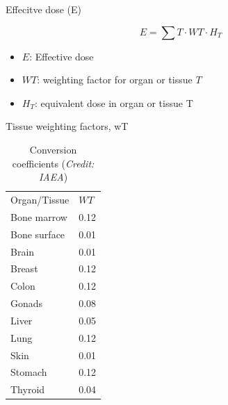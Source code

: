 \begin{frame}{Effecitve dose (E)}



\[E=\displaystyle\sum T\cdot WT\cdot H_T\]

\begin{itemize}
\item $E$: Effective dose
\item $WT$: weighting factor for organ or tissue $T$
\item $H_T$: equivalent dose in organ or tissue T
\end{itemize}


\end{frame}

\begin{frame}{Tissue weighting factors, wT}

\begin{table}[H]
\caption*{Conversion coefficients (\emph{Credit: IAEA})}
\begin{center}
  \begin{tabular}{ll}
  \toprule
  Organ/Tissue & $WT$  \\ \otoprule
Bone marrow & 0.12 \\ 
Bone surface & 0.01 \\
Brain & 0.01 \\
Breast & 0.12 \\
Colon & 0.12 \\
Gonads & 0.08 \\
Liver & 0.05 \\
Lung & 0.12 \\
Skin & 0.01 \\
Stomach & 0.12 \\
Thyroid & 0.04 \\ \bottomrule
\end{tabular}
\end{center}
\end{table}

\end{frame}



